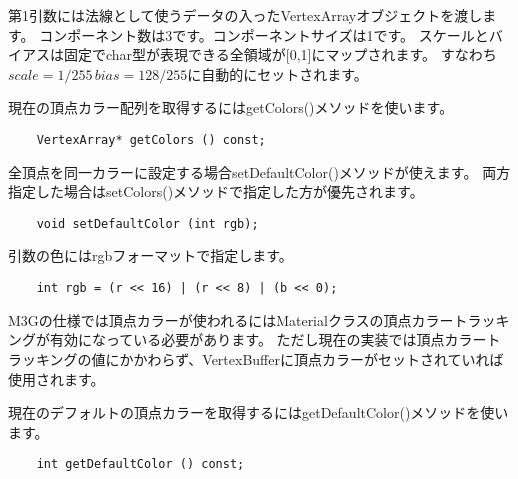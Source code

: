 第1引数には法線として使うデータの入ったVertexArrayオブジェクトを渡します。
コンポーネント数は3です。コンポーネントサイズは1です。
スケールとバイアスは固定でchar型が表現できる全領域が[0,1]にマップされます。
すなわち$ scale=1/255 \, bias=128/255 $に自動的にセットされます。

現在の頂点カラー配列を取得するにはgetColors()メソッドを使います。

\begin{verbatim}
    VertexArray* getColors () const;
\end{verbatim}

全頂点を同一カラーに設定する場合setDefaultColor()メソッドが使えます。
両方指定した場合はsetColors()メソッドで指定した方が優先されます。

\begin{verbatim}
    void setDefaultColor (int rgb);
\end{verbatim}

引数の色にはrgbフォーマットで指定します。

\begin{verbatim}
    int rgb = (r << 16) | (r << 8) | (b << 0);
\end{verbatim}

M3Gの仕様では頂点カラーが使われるにはMaterialクラスの頂点カラートラッキングが有効になっている必要があります。
ただし現在の実装では頂点カラートラッキングの値にかかわらず、VertexBufferに頂点カラーがセットされていれば使用されます。

現在のデフォルトの頂点カラーを取得するにはgetDefaultColor()メソッドを使います。

\begin{verbatim}
    int getDefaultColor () const;
\end{verbatim}








